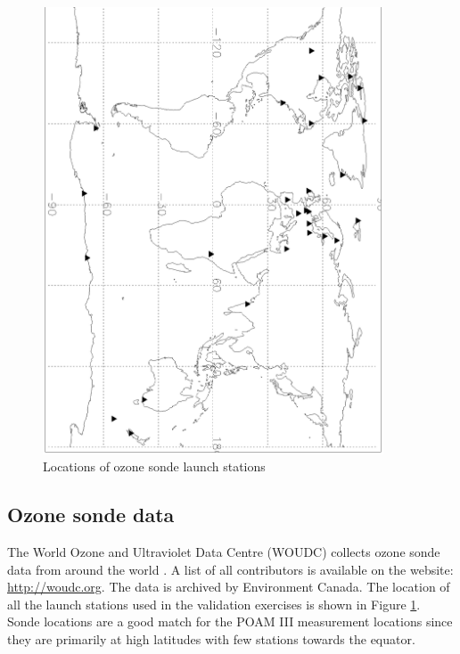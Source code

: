 \begin{figure}
  \begin{flushright}
    \includegraphics[width=0.9\textwidth]{ozone_sonde_stations}
    \caption{Locations of ozone sonde launch stations}
    \label{ozone_sonde_stations}
  \end{flushright}
\end{figure}

\subsection{Ozone sonde data}

The World Ozone and Ultraviolet Data Centre (WOUDC) collects ozone sonde data
from around the world \citep{Hare_etal2000}. A list of all contributors is available on the website:
\url{http://woudc.org}.
The data is archived by Environment Canada.
The location of all the launch stations used in the validation exercises is
shown in Figure \ref{ozone_sonde_stations}.
Sonde locations are a good match for the POAM III measurement locations
since they are primarily at high latitudes with few stations
towards the equator.

